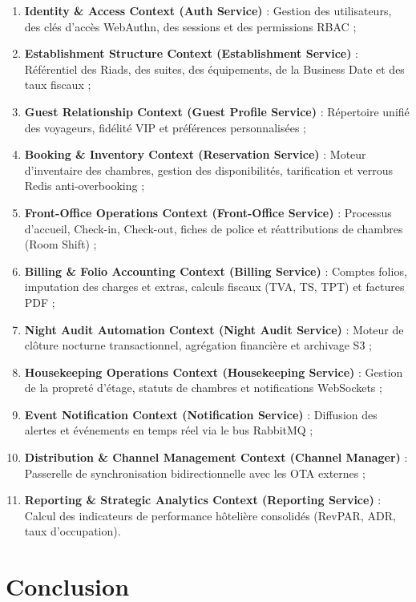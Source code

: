 \documentclass[12pt,a4paper,oneside]{report}
\begin{document}
\begin{enumerate}
    \item \textbf{Identity \& Access Context (Auth Service)} : Gestion des utilisateurs, des clés d'accès WebAuthn, des sessions et des permissions RBAC ;
    \item \textbf{Establishment Structure Context (Establishment Service)} : Référentiel des Riads, des suites, des équipements, de la Business Date et des taux fiscaux ;
    \item \textbf{Guest Relationship Context (Guest Profile Service)} : Répertoire unifié des voyageurs, fidélité VIP et préférences personnalisées ;
    \item \textbf{Booking \& Inventory Context (Reservation Service)} : Moteur d'inventaire des chambres, gestion des disponibilités, tarification et verrous Redis anti-overbooking ;
    \item \textbf{Front-Office Operations Context (Front-Office Service)} : Processus d'accueil, Check-in, Check-out, fiches de police et réattributions de chambres (Room Shift) ;
    \item \textbf{Billing \& Folio Accounting Context (Billing Service)} : Comptes folios, imputation des charges et extras, calculs fiscaux (TVA, TS, TPT) et factures PDF ;
    \item \textbf{Night Audit Automation Context (Night Audit Service)} : Moteur de clôture nocturne transactionnel, agrégation financière et archivage S3 ;
    \item \textbf{Housekeeping Operations Context (Housekeeping Service)} : Gestion de la propreté d'étage, statuts de chambres et notifications WebSockets ;
    \item \textbf{Event Notification Context (Notification Service)} : Diffusion des alertes et événements en temps réel via le bus RabbitMQ ;
    \item \textbf{Distribution \& Channel Management Context (Channel Manager)} : Passerelle de synchronisation bidirectionnelle avec les OTA externes ;
    \item \textbf{Reporting \& Strategic Analytics Context (Reporting Service)} : Calcul des indicateurs de performance hôtelière consolidés (RevPAR, ADR, taux d'occupation).
\end{enumerate}

\section{Conclusion}
\end{document}
